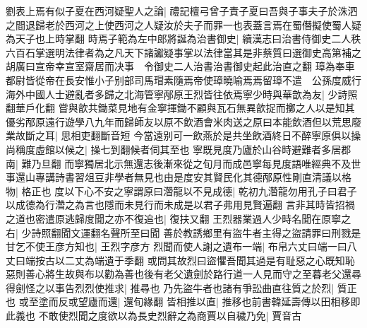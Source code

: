 劉表上焉有似子夏在西河疑聖人之論|{
	禮記檀弓曾子責子夏曰吾與子事夫子於洙泗之間退歸老於西河之上使西河之人疑汝於夫子而罪一也表蓋言焉在蜀僭擬使蜀人疑為天子也上時掌翻}
時焉子範為左中郎將誕為治書御史|{
	續漢志曰治書侍御史二人秩六百石掌選明法律者為之凡天下諸讞疑事掌以法律當其是非蔡質曰選御史高第補之胡廣曰宣帝幸宣室齋居而决事　令御史二人治書治書御史起此治直之翻}
璋為奉車都尉皆從帝在長安惟小子别部司馬瑁素隨焉帝使璋曉喻焉焉留璋不遣　公孫度威行海外中國人士避亂者多歸之北海管寧邴原王烈皆往依焉寧少時與華歆為友|{
	少詩照翻華戶化翻}
嘗與歆共鋤菜見地有金寧揮鋤不顧與瓦石無異歆捉而擲之人以是知其優劣邴原遠行遊學八九年而歸師友以原不飲酒會米肉送之原曰本能飲酒但以荒思廢業故斷之耳|{
	思相吏翻斷音短}
今當遠别可一飲燕於是共坐飲酒終日不醉寧原俱以操尚稱度虛館以候之|{
	操七到翻候者伺其至也}
寧既見度乃廬於山谷時避難者多居郡南|{
	難乃旦翻}
而寧獨居北示無還志後漸來從之旬月而成邑寧每見度語唯經典不及世事還山專講詩書習俎豆非學者無見也由是度安其賢民化其德邴原性剛直清議以格物|{
	格正也}
度以下心不安之寧謂原曰濳龍以不見成德|{
	乾初九濳龍勿用孔子曰君子以成德為行濳之為言也隱而未見行而未成是以君子弗用見賢遍翻}
言非其時皆招禍之道也密遣原逃歸度聞之亦不復追也|{
	復扶又翻}
王烈器業過人少時名聞在原寧之右|{
	少詩照翻聞文運翻名聲所至曰聞}
善於教誘鄉里有盜牛者主得之盜請罪曰刑戮是甘乞不使王彦方知也|{
	王烈字彦方}
烈聞而使人謝之遺布一端|{
	布帛六丈曰端一曰八丈曰端按古以二丈為端遺于季翻}
或問其故烈曰盜懼吾聞其過是有耻惡之心既知恥惡則善心將生故與布以勸為善也後有老父遺劍於路行道一人見而守之至暮老父還尋得劍怪之以事告烈烈使推求|{
	推尋也}
乃先盜牛者也諸有爭訟曲直往質之於烈|{
	質正也}
或至塗而反或望廬而還|{
	還旬緣翻}
皆相推以直|{
	推移也前書韓延壽傳以田相移即此義也}
不敢使烈聞之度欲以為長史烈辭之為商賈以自穢乃免|{
	賈音古}


